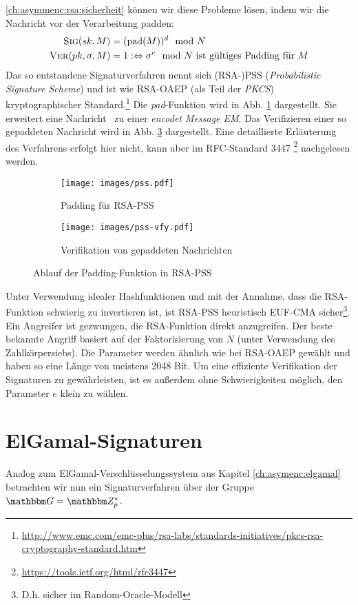 \ref{ch:asymmenc:rsa:sicherheit} können wir diese Probleme lösen, indem
wir die Nachricht vor der Verarbeitung padden:\indexRSAPSS
\begin{align*} 
  \textsc{Sig}(sk,M) &= (\text{pad}(M))^d \mod N\\
  \textsc{Ver}(pk,\sigma,M) &= 1 :\Leftrightarrow \sigma^e \mod N \text{
                               ist gültiges Padding für } M
\end{align*} 
Das so entstandene Signaturverfahren nennt sich (RSA-)PSS
(\emph{Probabilistic Signature Scheme}) und ist wie RSA-OAEP (als Teil
der \emph{PKCS}) kryptographischer
Standard.\footnote{\url{http://www.emc.com/emc-plus/rsa-labs/standards-initiatives/pkcs-rsa-cryptography-standard.htm}}
Die \textit{pad}-Funktion wird in Abb. \ref{fig:pss} dargestellt. Sie
erweitert eine Nachricht \plaint~zu einer \textit{encodet Message
  EM}. Das Verifizieren einer so gepaddeten Nachricht wird in
Abb. \ref{fig:pss-vfy} dargestellt. Eine detaillierte Erläuterung des
Verfahrens erfolgt hier nicht, kann aber im RFC-Standard 3447
\footnote{\url{https://tools.ietf.org/html/rfc3447}} nachgelesen werden.

\begin{figure}[h] \centering
  \begin{subfigure}[b]{.45\textwidth}
    \texttt{[image: images/pss.pdf]}
    \caption{Padding für RSA-PSS}
    \label{fig:pss}
  \end{subfigure}
  \begin{subfigure}[b]{.45\textwidth}
    \texttt{[image: images/pss-vfy.pdf]}
    \caption{Verifikation von gepaddeten Nachrichten}
    \label{fig:pss-vfy}
  \end{subfigure}
  \caption{Ablauf der Padding-Funktion in RSA-PSS}
\end{figure}

Unter Verwendung idealer Hashfunktionen und mit der Annahme, dass die
RSA-Funktion schwierig zu invertieren ist, ist RSA-PSS heuristisch
EUF-CMA sicher\footnote{D.h. sicher im Random-Oracle-Modell}. Ein
Angreifer ist gezwungen, die RSA-Funktion direkt anzugreifen. Der beste
bekannte Angriff basiert auf der Faktorisierung von $N$ (unter
Verwendung des Zahlkörpersiebs). Die Parameter werden ähnlich wie bei
RSA-OAEP gewählt und haben so eine Länge von meistens 2048 Bit. Um eine
effiziente Verifikation der Signaturen zu gewährleisten, ist es außerdem
ohne Schwierigkeiten möglich, den Parameter $e$ klein zu wählen.

\section{ElGamal-Signaturen}\indexElGamal 
Analog zum ElGamal-Verschlüsselungssystem aus Kapitel
\ref{ch:asymenc:elgamal} betrachten wir nun ein Signaturverfahren über
der Gruppe $\G = \Z{p}^*$.
